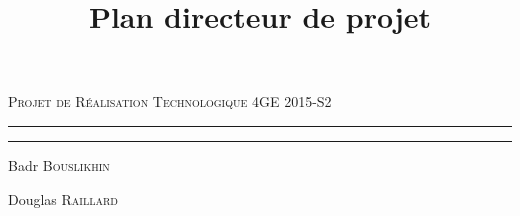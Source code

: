 \title{Plan directeur de projet}
\date{}


\begin{titlepage}
\begin{center}

\textsc{\Large Projet de Réalisation Technologique 4GE 2015-S2}
\vfill

\hrule
\bigskip
\huge\bfseries\thetitle{}
\bigskip
\hrule


\bigskip
\noindent
\begin{minipage}{0.4\textwidth}
	\begin{flushleft}
    	\large
    	Badr \textsc{Bouslikhin}
	\end{flushleft}
\end{minipage}%
\begin{minipage}{0.4\textwidth}
    \begin{flushright} \large
    	Douglas \textsc{Raillard}
    \end{flushright}
\end{minipage}

\vfill

{\large \thedate}

\end{center}
\end{titlepage}


